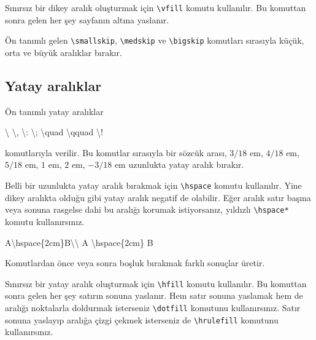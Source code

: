\documentclass[
  10pt,
]{scrbook}
\newenvironment{Shaded}{\begin{snugshade}}{\end{snugshade}}
\newcommand{\NormalTok}[1]{#1}
\newcommand{\SpecialCharTok}[1]{\textcolor[rgb]{0.00,0.00,0.00}{#1}}
\begin{document}
Sınırsız bir dikey aralık oluşturmak için \texttt{\textbackslash{}vfill} komutu kullanılır. Bu
komuttan sonra gelen her şey sayfanın altına yaslanır.

Ön tanımlı gelen \texttt{\textbackslash{}smallskip}, \texttt{\textbackslash{}medskip} ve \texttt{\textbackslash{}bigskip} komutları
sırasıyla küçük, orta ve büyük aralıklar bırakır.

\hypertarget{yatay-aralux131klar}{%
\subsection{Yatay aralıklar}\label{yatay-aralux131klar}}

Ön tanımlı yatay aralıklar

\begin{Shaded}
\begin{Highlighting}[]
\NormalTok{\textbackslash{}  \textbackslash{},  \textbackslash{}}\SpecialCharTok{:}\NormalTok{  \textbackslash{};  \textbackslash{}quad  \textbackslash{}qquad  \textbackslash{}}\SpecialCharTok{!}
\end{Highlighting}
\end{Shaded}

komutlarıyla verilir. Bu komutlar sırasıyla bir sözcük arası, \(3/\!18\) em, \(4/\!18\) em, \(5/\!18\) em, \(1\) em, \(2\) em, \(-3/\!18\) em uzunlukta yatay aralık bırakır.

Belli bir uzunlukta yatay aralık bırakmak için \texttt{\textbackslash{}hspace} komutu
kullanılır. Yine dikey aralıkta olduğu gibi yatay aralık negatif de
olabilir. Eğer aralık satır başına veya sonuna rasgelse dahi bu aralığı
korumak istiyorsanız, yıldızlı \texttt{\textbackslash{}hspace*} komutu kullanırsınız.

\begin{Shaded}
\begin{Highlighting}[]
\NormalTok{A\textbackslash{}hspace\{2cm\}B\textbackslash{}\textbackslash{}}
\NormalTok{A \textbackslash{}hspace\{2cm\} B}
\end{Highlighting}
\end{Shaded}

Komutlardan önce veya sonra boşluk bırakmak farklı
sonuçlar üretir.

Sınırsız bir yatay aralık oluşturmak için \texttt{\textbackslash{}hfill} komutu kullanılır. Bu
komuttan sonra gelen her şey satırın sonuna yaslanır. Hem satır sonuna
yaslamak hem de aralığı noktalarla doldurmak isterseniz \texttt{\textbackslash{}dotfill}
komutunu kullanırsınız. Satır sonuna yaslayıp aralığa çizgi çekmek
isterseniz de \texttt{\textbackslash{}hrulefill} komutunu kullanırsınız.
\end{document}
